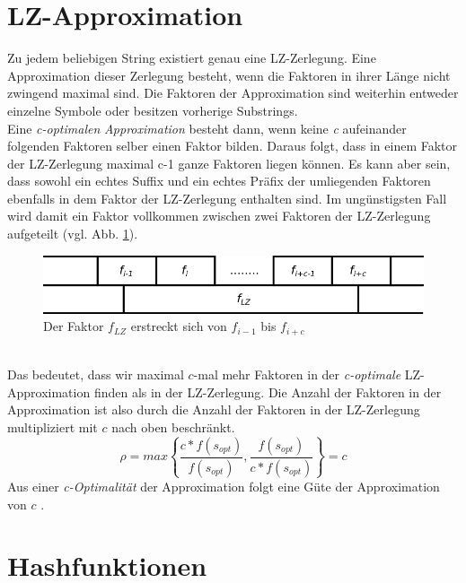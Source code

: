 \section{LZ-Approximation}
Zu jedem beliebigen String  existiert genau eine LZ-Zerlegung. Eine Approximation dieser Zerlegung besteht, wenn die Faktoren in ihrer Länge nicht zwingend maximal sind. Die Faktoren der Approximation sind weiterhin entweder einzelne Symbole oder besitzen vorherige Substrings.\\
Eine \textit{c-optimalen} \emph{Approximation} besteht dann, wenn keine \textit{c} aufeinander folgenden Faktoren selber einen Faktor bilden. 
Daraus folgt, dass in einem Faktor der LZ-Zerlegung maximal c-1 ganze Faktoren liegen können. Es kann aber sein, dass sowohl ein echtes Suffix und ein echtes Präfix der umliegenden Faktoren ebenfalls in dem Faktor der LZ-Zerlegung enthalten sind. Im ungünstigsten Fall wird damit ein Faktor vollkommen zwischen zwei Faktoren der LZ-Zerlegung aufgeteilt (vgl. Abb. \ref{flz}). 
%
\begin{figure}[h]
	\includegraphics[width=\textwidth,keepaspectratio]{faktorenmerge}
	\caption{Der Faktor $f_{LZ}$ erstreckt sich von $f_{i-1}$ bis $f_{i+c}$}
	\label{flz}
\end{figure}\\
Das bedeutet, dass wir maximal $c$-mal mehr Faktoren in der \textit{c-optimale} LZ-Approximation finden als in der  LZ-Zerlegung.
Die Anzahl der Faktoren in der Approximation ist also durch die Anzahl der Faktoren in der LZ-Zerlegung multipliziert mit $c$ nach oben beschränkt.  
\begin{equation}\nonumber
\rho = max
\left\{
\frac{c*f(s_{opt})}{f(s_{opt})},\frac{f(s_{opt})}{c * f(s_{opt})}
\right\} = c
\end{equation}
Aus einer \textit{c-Optimalität} der Approximation folgt eine Güte der Approximation von $c$ \cite{LZ77Approx}.\\

\section{Hashfunktionen}

